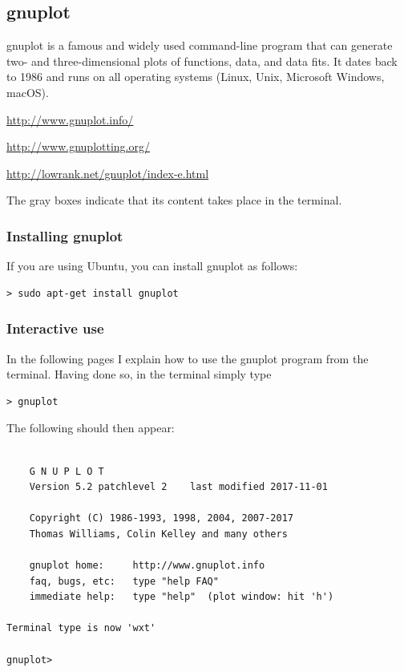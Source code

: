 \subsection{gnuplot}

gnuplot is a famous and widely used command-line program that can 
generate two- and three-dimensional plots of functions, data, and data fits.
It dates back to 1986 and runs on all operating systems (Linux, Unix, Microsoft Windows, macOS). 

\url{http://www.gnuplot.info/}

\url{http://www.gnuplotting.org/}

\url{http://lowrank.net/gnuplot/index-e.html}

The gray boxes indicate that its content takes place in the terminal.

\subsubsection*{Installing gnuplot}

If you are using Ubuntu, you can install gnuplot as follows:


\begin{mdframed}[backgroundcolor=gray!10]
\begin{verbatim}
> sudo apt-get install gnuplot
\end{verbatim}
\end{mdframed}


\subsubsection*{Interactive use}

In the following pages I explain how to use the gnuplot program from the terminal.
Having done so, in the terminal simply type

\begin{mdframed}[backgroundcolor=gray!10]
\begin{verbatim}
> gnuplot
\end{verbatim}
\end{mdframed}

The following should then appear:

\begin{mdframed}[backgroundcolor=gray!10]
\begin{verbatim}

	G N U P L O T
	Version 5.2 patchlevel 2    last modified 2017-11-01 

	Copyright (C) 1986-1993, 1998, 2004, 2007-2017
	Thomas Williams, Colin Kelley and many others

	gnuplot home:     http://www.gnuplot.info
	faq, bugs, etc:   type "help FAQ"
	immediate help:   type "help"  (plot window: hit 'h')

Terminal type is now 'wxt'

gnuplot>
\end{verbatim}
\end{mdframed}

